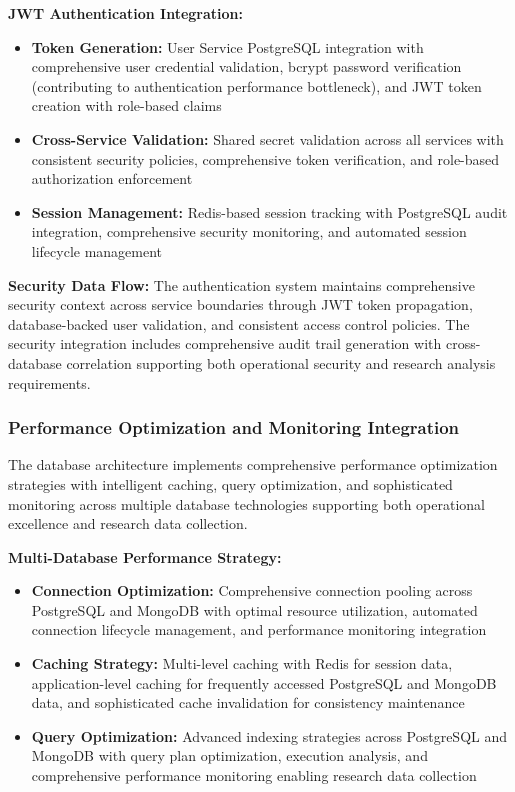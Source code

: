 \textbf{JWT Authentication Integration:}
\begin{itemize}
\item \textbf{Token Generation:} User Service PostgreSQL integration with comprehensive user credential validation, bcrypt password verification (contributing to authentication performance bottleneck), and JWT token creation with role-based claims
\item \textbf{Cross-Service Validation:} Shared secret validation across all services with consistent security policies, comprehensive token verification, and role-based authorization enforcement
\item \textbf{Session Management:} Redis-based session tracking with PostgreSQL audit integration, comprehensive security monitoring, and automated session lifecycle management
\end{itemize}

\textbf{Security Data Flow:}
The authentication system maintains comprehensive security context across service boundaries through JWT token propagation, database-backed user validation, and consistent access control policies. The security integration includes comprehensive audit trail generation with cross-database correlation supporting both operational security and research analysis requirements.

\subsubsection{Performance Optimization and Monitoring Integration}

The database architecture implements comprehensive performance optimization strategies with intelligent caching, query optimization, and sophisticated monitoring across multiple database technologies supporting both operational excellence and research data collection.

\textbf{Multi-Database Performance Strategy:}
\begin{itemize}
\item \textbf{Connection Optimization:} Comprehensive connection pooling across PostgreSQL and MongoDB with optimal resource utilization, automated connection lifecycle management, and performance monitoring integration
\item \textbf{Caching Strategy:} Multi-level caching with Redis for session data, application-level caching for frequently accessed PostgreSQL and MongoDB data, and sophisticated cache invalidation for consistency maintenance
\item \textbf{Query Optimization:} Advanced indexing strategies across PostgreSQL and MongoDB with query plan optimization, execution analysis, and comprehensive performance monitoring enabling research data collection
\end{itemize}

